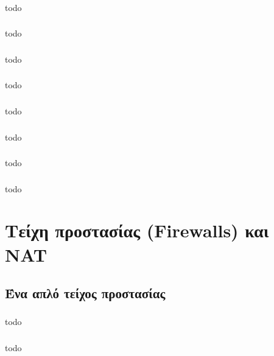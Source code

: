 \documentclass[a4paper, 12pt]{article}
\begin{document}
		\subsubsection{}
			todo

		\subsubsection{}
			todo

		\subsubsection{}
			todo

		\subsubsection{}
			todo

		\subsubsection{}
			todo

		\subsubsection{}
			todo

		\subsubsection{}
			todo

		\subsubsection{}
			todo

\section{Τείχη προστασίας (Firewalls) και NAT}

	\subsection{Ένα απλό τείχος προστασίας}

		\subsubsection{}
			todo

		\subsubsection{}
			todo
\end{document}
